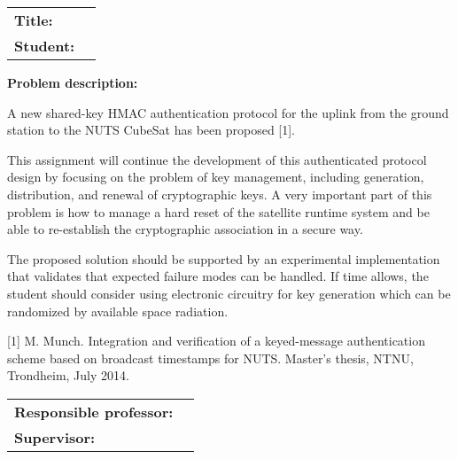 \begin{titlingpage}

\noindent
\begin{tabular}{@{}p{4cm}l}
\textbf{Title:} 	& \thetitle \\
\textbf{Student:}	& \theauthor \\
\end{tabular}

\vspace{4ex}
\noindent\textbf{Problem description:}
\vspace{2ex}

A new shared-key HMAC authentication protocol for the uplink from the ground station to the NUTS CubeSat has been proposed [1].

This assignment will continue the development of this authenticated protocol design by focusing on the problem of key management, including generation, distribution, and renewal of cryptographic keys.  A very important part of this problem is how to manage a hard reset of the satellite runtime system and be able to re-establish the cryptographic association in a secure way.

The proposed solution should be supported by an experimental implementation that validates that expected failure modes can be handled. If time allows, the student should consider using
electronic circuitry for key generation which can be randomized by available space radiation.

[1]  M. Munch.  Integration and verification of a keyed-message authentication scheme based on broadcast timestamps for NUTS. Master's thesis, NTNU, Trondheim, July 2014.

\vspace{6ex}

\noindent
\begin{tabular}{@{}p{4cm}l}
\textbf{Responsible professor:} 	& \theprofessor \\
\textbf{Supervisor:}			& \thesupervisor \\
\end{tabular}

\end{titlingpage}
